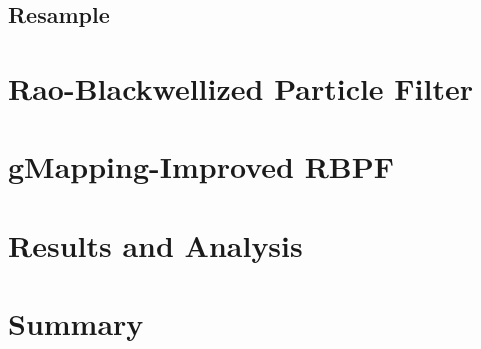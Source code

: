 \subsection{Resample}

\section{Rao-Blackwellized Particle Filter}

\section{gMapping-Improved RBPF}

\section{Results and Analysis}

\section{Summary}